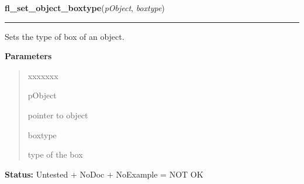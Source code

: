 \hspace{.8\funcindent}\begin{boxedminipage}{\funcwidth}

    \raggedright \textbf{fl\_set\_object\_boxtype}(\textit{pObject}, \textit{boxtype})

    \vspace{-1.5ex}

    \rule{\textwidth}{0.5\fboxrule}
\setlength{\parskip}{2ex}
    Sets the type of box of an object.

\setlength{\parskip}{1ex}
      \textbf{Parameters}
      \vspace{-1ex}

      \begin{quote}
        \begin{Ventry}{xxxxxxx}

          \item[pObject]

          pointer to object

          \item[boxtype]

          type of the box

        \end{Ventry}

      \end{quote}

\textbf{Status:} Untested + NoDoc + NoExample = NOT OK



    \end{boxedminipage}

    \label{xformslib:library:fl_get_object_boxtype}

    \vspace{0.5ex}

